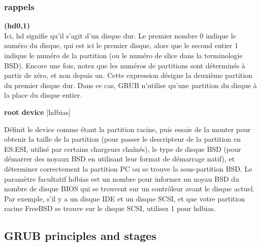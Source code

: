 \documentclass[10]{article}
\begin{document}
\subsubsection{rappels}
\textbf{(hd0,1)}\\
Ici, hd signifie qu'il s'agit d'un disque dur. Le premier nombre 0 indique le num\'ero du disque, qui est ici le premier disque, alors que le second entier 1 indique le num\'ero de la partition (ou le num\'ero de slice dans la terminologie BSD). Encore une fois, notez que les num\'eros de partitions sont d\'etermin\'es \`a partir de z\'ero, et non depuis un. Cette expression d\'esigne la deuxi\`eme partition du premier disque dur. Dans ce cas, GRUB n'utilise qu'une partition du disque \`a la place du disque entier.  

\textbf{root device} [hdbias] 	

D\'efinit le device comme \'etant la partition racine, puis essaie de la monter pour obtenir la taille de la partition (pour passer le descripteur de la partition en ES:ESI, utilis\'e par certains chargeurs chaîn\'es), le type de disque BSD (pour d\'emarrer des noyaux BSD en utilisant leur format de d\'emarrage natif), et d\'eterminer correctement la partition PC ou se trouve la sous-partition BSD. Le param\`etre facultatif hdbias est un nombre pour informer un noyau BSD du nombre de disque BIOS qui se trouvent sur un contrôleur avant le disque actuel. Par exemple, s'il y a un disque IDE et un disque SCSI, et que votre partition racine FreeBSD se trouve sur le disque SCSI, utilisez 1 pour hdbias. 

\subsection{GRUB principles and stages}
\end{document}
